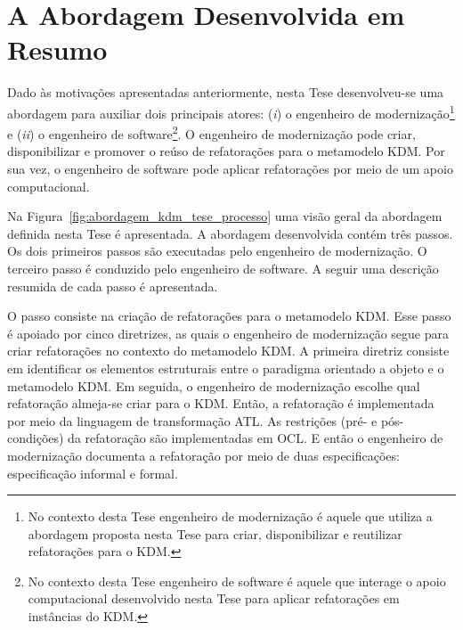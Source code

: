 

\section{A Abordagem Desenvolvida em Resumo}\label{sec:introducao:a_abordagem_desenvolvida}

Dado às motivações apresentadas anteriormente, nesta Tese desenvolveu-se uma abordagem para auxiliar dois principais atores: (\textit{i}) o engenheiro de modernização\footnote{No contexto desta Tese engenheiro de modernização é aquele que utiliza a abordagem proposta nesta Tese para criar, disponibilizar e reutilizar refatorações para o KDM.} e  (\textit{ii}) o engenheiro de software\footnote{No contexto desta Tese engenheiro de software é aquele que interage o apoio computacional desenvolvido nesta Tese para aplicar refatorações em instâncias do KDM.}. O engenheiro de modernização pode criar, disponibilizar e promover o reúso de refatorações para o metamodelo KDM. Por sua vez, o engenheiro de software pode aplicar refatorações por meio de um apoio computacional.%



Na Figura~\ref{fig:abordagem_kdm_tese_processo} uma visão geral da abordagem definida nesta Tese é apresentada. A abordagem desenvolvida contém três passos. Os dois primeiros passos são executadas pelo engenheiro de modernização. O terceiro passo é conduzido pelo engenheiro de software. A seguir uma descrição resumida de cada passo é apresentada.

O passo  consiste na criação de refatorações para o metamodelo KDM. Esse passo é apoiado por cinco diretrizes, as quais o engenheiro de modernização segue para criar refatorações no contexto do metamodelo KDM. A primeira diretriz consiste em identificar os elementos estruturais entre o paradigma orientado a objeto e o metamodelo KDM. Em seguida, o engenheiro de modernização escolhe qual refatoração almeja-se criar para o KDM. Então, a refatoração é implementada por meio da linguagem de transformação ATL. As restrições (pré- e pós-condições) da refatoração são implementadas em OCL. E então o engenheiro de modernização documenta a refatoração por meio de duas especificações: especificação informal e formal.



